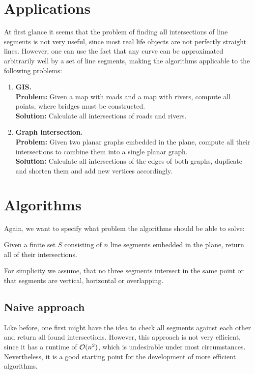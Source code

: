 \section{Applications}
    At first glance it seems that the problem of finding all intersections of line segments is not very useful, since most real life objects are not perfectly straight lines. However, one can use the fact that any curve can be approximated arbitrarily well by a set of line segments, making the algorithms applicable to the following problems:
    \begin{enumerate}
        \item \textbf{GIS.} \\
        \textbf{Problem:} Given a map with roads and a map with rivers, compute all points, where bridges must be constructed. \\
        \textbf{Solution:} Calculate all intersections of roads and rivers. 

        \item \textbf{Graph intersection.} \\
        \textbf{Problem:} Given two planar graphs embedded in the plane, compute all their intersections to combine them into a single planar graph. \\
        \textbf{Solution:} Calculate all intersections of the edges of both graphs, duplicate and shorten them and add new vertices accordingly. 
    \end{enumerate} 

\section{Algorithms}
    Again, we want to specify what problem the algorithms should be able to solve:
    \begin{mdframed}
        Given a finite set $S$ consisting of $n$ line segments embedded in the plane, return all of their intersections. 
    \end{mdframed}
    For simplicity we assume, that no three segments intersect in the same point or that segments are vertical, horizontal or overlapping.

    \subsection{Naive approach}
        Like before, one first might have the idea to check all segments against each other and return all found intersections. However, this approach is not very efficient, since it has a runtime of $\mathcal{O}(n^2)$, which is undesirable under most circumstances. Nevertheless, it is a good starting point for the development of more efficient algorithms.

